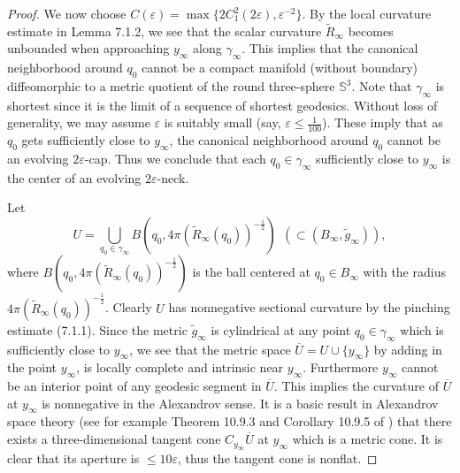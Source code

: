\begin{proof}
We now choose $C(\varepsilon) = \max \{
2C_1^2(2\varepsilon),\varepsilon^{-2}\}$. By the local curvature
estimate in Lemma 7.1.2, we see that the scalar curvature
$\tilde{R}_{\infty}$ becomes unbounded when approaching
$y_{\infty}$ along $\gamma_{\infty}$. This implies that the
canonical neighborhood around $q_0$ cannot be a compact manifold
(without boundary) diffeomorphic to a metric quotient of the round
three-sphere $\mathbb{S}^3$. Note that $\gamma_{\infty}$ is
shortest since it is the limit of a sequence of shortest
geodesics. Without loss of generality, we may assume $\varepsilon$
is suitably small (say, $\varepsilon \leq \frac{1}{100}$). These
imply that as $q_0$ gets sufficiently close to $y_{\infty}$, the
canonical neighborhood around $q_0$ cannot be an evolving
$2\varepsilon$-cap. Thus we conclude that each $q_0 \in
\gamma_{\infty}$ sufficiently close to $y_{\infty}$ is the center
of an evolving $2\varepsilon$-neck.

Let
$$
U=\bigcup\limits_{q_0\in
\gamma_{\infty}}B(q_0,4\pi(\tilde{R}_{\infty}(q_0))^{-\frac{1}{2}})\
\ (\subset (B_{\infty}, \tilde{g}_{\infty})),
$$
where $B(q_0,4\pi(\tilde{R}_{\infty}(q_0))^{-\frac{1}{2}})$ is the
ball centered at $q_0\in B_{\infty}$ with the radius
$4\pi(\tilde{R}_{\infty}(q_0))^{-\frac{1}{2}}$. Clearly $U$ has
nonnegative sectional curvature by the pinching estimate (7.1.1).
Since the metric $\tilde{g}_{\infty}$ is cylindrical at any point
$q_0\in \gamma_{\infty}$ which is sufficiently close to
$y_{\infty}$, we see that the metric space $\overline{U}=U\cup
\{y_{\infty}\}$ by adding in the point $y_{\infty}$, is locally
complete and intrinsic near $y_{\infty}$. Furthermore $y_{\infty}$
cannot be an interior point of any geodesic segment in
$\overline{U}$. This implies the curvature of $\overline{U}$ at
$y_{\infty}$ is nonnegative in the Alexandrov sense. It is a basic
result in Alexandrov space theory (see for example Theorem 10.9.3
and Corollary 10.9.5 of \cite{BBI}) that there exists a
three-dimensional tangent cone $C_{y_{\infty}}\overline{U}$ at
$y_{\infty}$ which is a metric cone. It is clear that its aperture
is $\leq 10\varepsilon$, thus the tangent cone is nonflat.


\end{proof}
